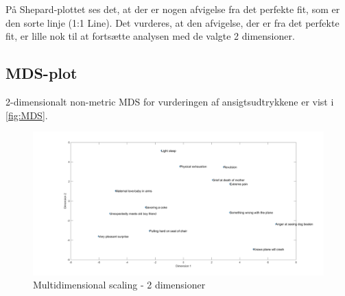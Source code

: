 \noindent På Shepard-plottet ses det, at der er nogen afvigelse fra det perfekte fit, som er den sorte linje (1:1 Line). Det vurderes, at den afvigelse, der er fra det perfekte fit, er lille nok til at fortsætte analysen med de valgte 2 dimensioner. 

\subsection*{MDS-plot}
2-dimensionalt non-metric MDS for vurderingen af ansigtsudtrykkene er vist i \autoref{fig:MDS}.  
%
\begin{figure}[H]
\centering
\includegraphics[width =\textwidth]{Figure/MDS_plot} 
\caption{Multidimensional scaling - 2 dimensioner}
\label{fig:MDS}
\end{figure}
%

